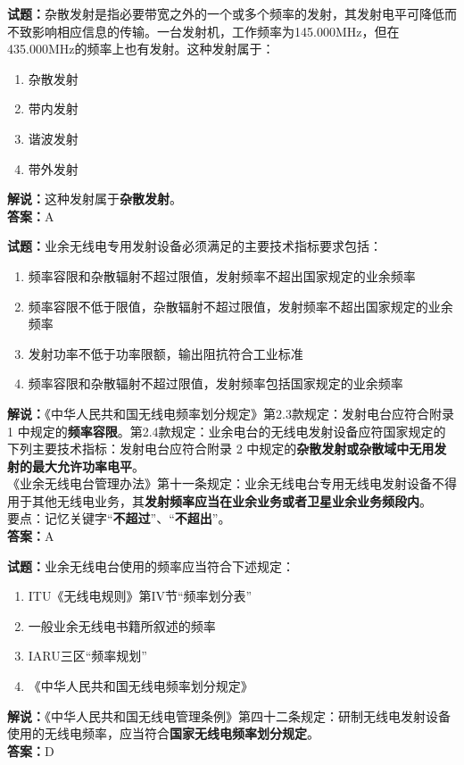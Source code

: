 \documentclass{ctexbook}
\begin{document}
\bigskip


\noindent\textbf{试题：}杂散发射是指必要带宽之外的一个或多个频率的发射，其发射电平可降低而不致影响相应信息的传输。一台发射机，工作频率为145.000MHz，但在435.000MHz的频率上也有发射。这种发射属于：
\begin{enumerate}[leftmargin=3em]
\item 杂散发射
\item 带内发射
\item 谐波发射
\item 带外发射
\end{enumerate}
\noindent\textbf{解说：}这种发射属于\textbf{杂散发射}。\\\noindent\textbf{答案：}A




\bigskip


\noindent\textbf{试题：}业余无线电专用发射设备必须满足的主要技术指标要求包括：
\begin{enumerate}[leftmargin=3em]
\item 频率容限和杂散辐射不超过限值，发射频率不超出国家规定的业余频率
\item 频率容限不低于限值，杂散辐射不超过限值，发射频率不超出国家规定的业余频率
\item 发射功率不低于功率限额，输出阻抗符合工业标准
\item 频率容限和杂散辐射不超过限值，发射频率包括国家规定的业余频率
\end{enumerate}
\noindent\textbf{解说：}《中华人民共和国无线电频率划分规定》第2.3款规定：发射电台应符合附录 1 中规定的\textbf{频率容限}。第2.4款规定：业余电台的无线电发射设备应符国家规定的下列主要技术指标：发射电台应符合附录 2 中规定的\textbf{杂散发射或杂散域中无用发射的最大允许功率电平}。\\《业余无线电台管理办法》第十一条规定：业余无线电台专用无线电发射设备不得用于其他无线电业务，其\textbf{发射频率应当在业余业务或者卫星业余业务频段内}。\\要点：记忆关键字“\textbf{不超过}”、“\textbf{不超出}”。\\\noindent\textbf{答案：}A

\bigskip


\noindent\textbf{试题：}业余无线电台使用的频率应当符合下述规定：
\begin{enumerate}[leftmargin=3em]
\item ITU《无线电规则》第IV节“频率划分表”
\item 一般业余无线电书籍所叙述的频率
\item IARU三区“频率规划”
\item 《中华人民共和国无线电频率划分规定》
\end{enumerate}
\noindent\textbf{解说：}《中华人民共和国无线电管理条例》第四十二条规定：研制无线电发射设备使用的无线电频率，应当符合\textbf{国家无线电频率划分规定}。\\\noindent\textbf{答案：}D
\end{document}
